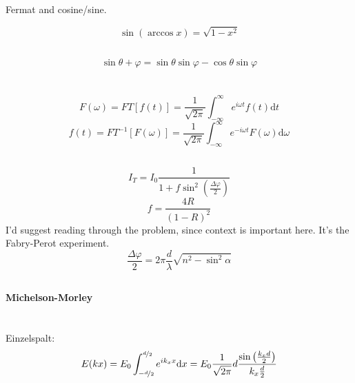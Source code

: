 \documentclass[12pt]{report}
\newcommand{\vphi}{\varphi}
\newcommand{\dd}{\mathrm{d}}
\begin{document}
Fermat and cosine/sine.

\[\sin(\arccos x)=\sqrt{1-x^2}\]

\subsection{}
\[\sin\theta+\vphi=\sin\theta\sin\vphi-\cos\theta\sin\vphi\]

\section{}

\subsection{}
\[F(\omega)=FT[f(t)]=\frac{1}{\sqrt{2\pi}}\int_{-\infty}^\infty e^{i\omega t}f(t)\dd t\]
\[f(t)=FT^{-1}[F(\omega)]=\frac{1}{\sqrt{2\pi}}\int_{-\infty}^\infty e^{-i\omega t}F(\omega)\dd\omega\]

\subsection{}

\[I_T=I_0\frac{1}{1+f\sin^2\left(\frac{\Delta\vphi}{2}\right)}\]
\[f=\frac{4R}{(1-R)^2}\]
I'd suggest reading through the problem, since context is important here. It's the Fabry-Perot experiment.
\[\frac{\Delta\vphi}{2}=2\pi\frac{d}{\lambda}\sqrt{n^2-\sin^2\alpha}\]

\subsection{}

\textbf{Michelson-Morley}

\section{}

\subsection{}

Einzelspalt:
\[E(kx)=E_0\int_{-\nicefrac{d}{2}}^{\nicefrac{d}{2}}e^{ik_xx}\dd x=E_0\frac{1}{\sqrt{2\pi}}d\frac{\sin\left(\frac{k_xd}{2}\right)}{k_x\frac{d}{2}}\]

\subsection{}
\end{document}
